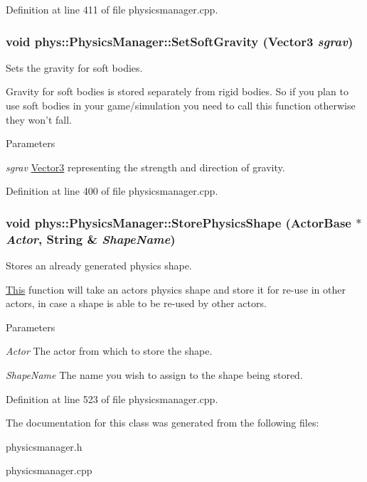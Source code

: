 Definition at line 411 of file physicsmanager.cpp.

\hypertarget{classphys_1_1PhysicsManager_acd1fe36f7cd593da0c466002304065eb}{
\subsubsection[{SetSoftGravity}]{\setlength{\rightskip}{0pt plus 5cm}void phys::PhysicsManager::SetSoftGravity ({\bf Vector3} {\em sgrav})}}
\label{d3/dcc/classphys_1_1PhysicsManager_acd1fe36f7cd593da0c466002304065eb}


Sets the gravity for soft bodies. 

Gravity for soft bodies is stored separately from rigid bodies. So if you plan to use soft bodies in your game/simulation you need to call this function otherwise they won't fall. 
\begin{DoxyParams}{Parameters}
\item[{\em sgrav}]\hyperlink{classphys_1_1Vector3}{Vector3} representing the strength and direction of gravity. \end{DoxyParams}


Definition at line 400 of file physicsmanager.cpp.

\hypertarget{classphys_1_1PhysicsManager_a24fae734b5750db6fc1d2b1e3656bb71}{
\subsubsection[{StorePhysicsShape}]{\setlength{\rightskip}{0pt plus 5cm}void phys::PhysicsManager::StorePhysicsShape ({\bf ActorBase} $\ast$ {\em Actor}, \/  {\bf String} \& {\em ShapeName})}}
\label{d3/dcc/classphys_1_1PhysicsManager_a24fae734b5750db6fc1d2b1e3656bb71}


Stores an already generated physics shape. 

\hyperlink{structThis}{This} function will take an actors physics shape and store it for re-\/use in other actors, in case a shape is able to be re-\/used by other actors. 
\begin{DoxyParams}{Parameters}
\item[{\em Actor}]The actor from which to store the shape. \item[{\em ShapeName}]The name you wish to assign to the shape being stored. \end{DoxyParams}


Definition at line 523 of file physicsmanager.cpp.



The documentation for this class was generated from the following files:\begin{DoxyCompactItemize}
\item 
physicsmanager.h\item 
physicsmanager.cpp\end{DoxyCompactItemize}
